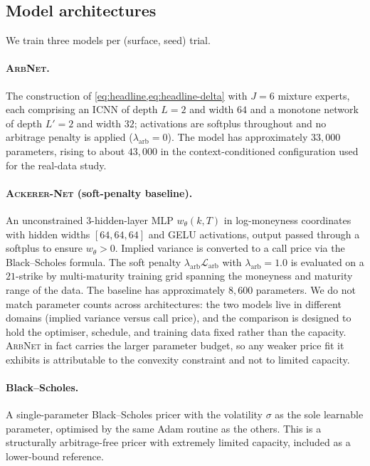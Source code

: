 \documentclass[largeformat]{interact}
\theoremstyle{plain}
\theoremstyle{definition}
\newcommand{\arbnet}{\textsc{ArbNet}}
\newcommand{\ackerer}{\textsc{Ackerer-Net}}
\newcommand{\bs}{Black--Scholes}
\begin{document}
\subsection{Model architectures}
\label{sec:model-arch}

We train three models per (surface, seed) trial.

\paragraph{\arbnet{}.}
The construction of \cref{eq:headline,eq:headline-delta} with $J = 6$ mixture experts, each comprising an ICNN of depth $L = 2$ and width $64$ and a monotone network of depth $L' = 2$ and width $32$; activations are softplus throughout and no arbitrage penalty is applied ($\lambda_{\mathrm{arb}} = 0$). The model has approximately $33{,}000$ parameters, rising to about $43{,}000$ in the context-conditioned configuration used for the real-data study.

\paragraph{\ackerer{} (soft-penalty baseline).}
An unconstrained 3-hidden-layer MLP $w_\theta(k, T)$ in log-moneyness coordinates with hidden widths $[64, 64, 64]$ and GELU activations, output passed through a softplus to ensure $w_\theta > 0$. Implied variance is converted to a call price via the \bs{} formula. The soft penalty $\lambda_{\mathrm{arb}}\mathcal{L}_{\mathrm{arb}}$ with $\lambda_{\mathrm{arb}} = 1.0$ is evaluated on a $21$-strike by multi-maturity training grid spanning the moneyness and maturity range of the data. The baseline has approximately $8{,}600$ parameters. We do not match parameter counts across architectures: the two models live in different domains (implied variance versus call price), and the comparison is designed to hold the optimiser, schedule, and training data fixed rather than the capacity. \arbnet{} in fact carries the larger parameter budget, so any weaker price fit it exhibits is attributable to the convexity constraint and not to limited capacity.

\paragraph{\bs{}.}
A single-parameter \bs{} pricer with the volatility $\sigma$ as the sole learnable parameter, optimised by the same Adam routine as the others. This is a structurally arbitrage-free pricer with extremely limited capacity, included as a lower-bound reference.
\end{document}
